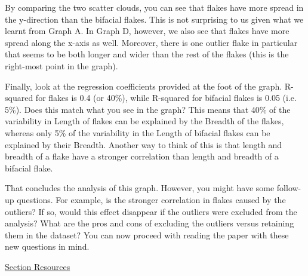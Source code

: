 \documentclass{article}
\begin{document}
By comparing the two scatter clouds, you can see that flakes have more spread in the y-direction than the bifacial flakes. This is not surprising to us given what we learnt from Graph A. In Graph D, however, we also see that flakes have more spread along the x-axis as well. Moreover, there is one outlier flake in particular that seems to be both longer and wider than the rest of the flakes (this is the right-most point in the graph).

Finally, look at the regression coefficients provided at the foot of the graph. R-squared for flakes is 0.4 (or 40\%), while R-squared for bifacial flakes is 0.05 (i.e. 5\%). Does this match what you see in the graph? This means that 40\% of the variability in Length of flakes can be explained by the Breadth of the flakes, whereas only 5\% of the variability in the Length of bifacial flakes can be explained by their Breadth. Another way to think of this is that length and breadth of a flake have a stronger correlation than length and breadth of a bifacial flake.

That concludes the analysis of this graph. However, you might have some follow-up questions. For example, is the stronger correlation in flakes caused by the outliers? If so, would this effect disappear if the outliers were excluded from the analysis? What are the pros and cons of excluding the outliers versus retaining them in the dataset?
You can now proceed with reading the paper with these new questions in mind.

\underline{Section Resources}
\end{document}
